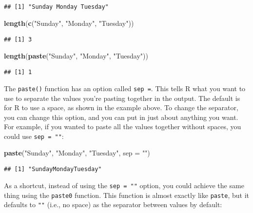 \documentclass[]{book}
\makeatletter
\newenvironment{Shaded}{\begin{snugshade}}{\end{snugshade}}
\newcommand{\KeywordTok}[1]{\textcolor[rgb]{0.13,0.29,0.53}{\textbf{#1}}}
\newcommand{\DataTypeTok}[1]{\textcolor[rgb]{0.13,0.29,0.53}{#1}}
\newcommand{\StringTok}[1]{\textcolor[rgb]{0.31,0.60,0.02}{#1}}
\newcommand{\NormalTok}[1]{#1}
\newenvironment{kframe}{%
\medskip{}
\setlength{\fboxsep}{.8em}
 \def\at@end@of@kframe{}%
 \ifinner\ifhmode%
  \def\at@end@of@kframe{\end{minipage}}%
  \begin{minipage}{\columnwidth}%
 \fi\fi%
 \def\FrameCommand##1{\hskip\@totalleftmargin \hskip-\fboxsep
 \colorbox{shadecolor}{##1}\hskip-\fboxsep
     \hskip-\linewidth \hskip-\@totalleftmargin \hskip\columnwidth}%
 \MakeFramed {\advance\hsize-\width
   \@totalleftmargin\z@ \linewidth\hsize
   \@setminipage}}%
 {\par\unskip\endMakeFramed%
 \at@end@of@kframe}
\renewenvironment{Shaded}{\begin{kframe}}{\end{kframe}}
\theoremstyle{definition}
\theoremstyle{definition}
\theoremstyle{definition}
\theoremstyle{remark}
\makeatother
\begin{document}
\begin{verbatim}
## [1] "Sunday Monday Tuesday"
\end{verbatim}

\begin{Shaded}
\begin{Highlighting}[]
\KeywordTok{length}\NormalTok{(}\KeywordTok{c}\NormalTok{(}\StringTok{"Sunday"}\NormalTok{, }\StringTok{"Monday"}\NormalTok{, }\StringTok{"Tuesday"}\NormalTok{))}
\end{Highlighting}
\end{Shaded}

\begin{verbatim}
## [1] 3
\end{verbatim}

\begin{Shaded}
\begin{Highlighting}[]
\KeywordTok{length}\NormalTok{(}\KeywordTok{paste}\NormalTok{(}\StringTok{"Sunday"}\NormalTok{, }\StringTok{"Monday"}\NormalTok{, }\StringTok{"Tuesday"}\NormalTok{))}
\end{Highlighting}
\end{Shaded}

\begin{verbatim}
## [1] 1
\end{verbatim}

The \texttt{paste()} function has an option called \texttt{sep\ =}. This
tells R what you want to use to separate the values you're pasting
together in the output. The default is for R to use a space, as shown in
the example above. To change the separator, you can change this option,
and you can put in just about anything you want. For example, if you
wanted to paste all the values together without spaces, you could use
\texttt{sep\ =\ ""}:

\begin{Shaded}
\begin{Highlighting}[]
\KeywordTok{paste}\NormalTok{(}\StringTok{"Sunday"}\NormalTok{, }\StringTok{"Monday"}\NormalTok{, }\StringTok{"Tuesday"}\NormalTok{, }\DataTypeTok{sep =} \StringTok{""}\NormalTok{)}
\end{Highlighting}
\end{Shaded}

\begin{verbatim}
## [1] "SundayMondayTuesday"
\end{verbatim}

As a shortcut, instead of using the \texttt{sep\ =\ ""} option, you
could achieve the same thing using the \texttt{paste0} function. This
function is almost exactly like \texttt{paste}, but it defaults to
\texttt{""} (i.e., no space) as the separator between values by default:
\end{document}

